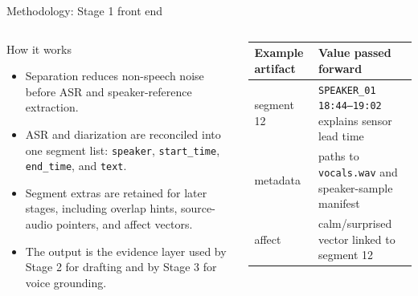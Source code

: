 \documentclass[aspectratio=169,10pt]{beamer}
\begin{document}
\begin{frame}{Methodology: Stage 1 front end}
\begin{columns}[T,totalwidth=\textwidth]
\begin{block}{How it works}
{\fontsize{6.4}{7}\selectfont
\begin{itemize}
  \item Separation reduces non-speech noise before ASR and speaker-reference extraction.
  \item ASR and diarization are reconciled into one segment list: \texttt{speaker}, \texttt{start\_time}, \texttt{end\_time}, and \texttt{text}.
  \item Segment extras are retained for later stages, including overlap hints, source-audio pointers, and affect vectors.
  \item The output is the evidence layer used by Stage 2 for drafting and by Stage 3 for voice grounding.
\end{itemize}
}
\end{block}
\vspace{0.2em}
{\fontsize{6.1}{6.8}\selectfont
\begin{tabularx}{\linewidth}{p{1.25cm}Y}
\toprule
Example artifact & Value passed forward \\
\midrule
segment 12 & \texttt{SPEAKER\_01 18:44--19:02} explains sensor lead time \\
metadata & paths to \texttt{vocals.wav} and speaker-sample manifest \\
affect & calm/surprised vector linked to segment 12 \\
\bottomrule
\end{tabularx}
}
\end{columns}
\end{frame}
\end{document}
